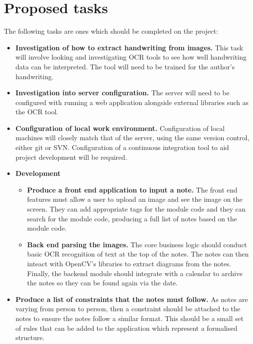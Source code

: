 \documentclass[11pt,fleqn,twoside]{article}
\begin{document}
\section{Proposed tasks}
The following tasks are ones which should be completed on the project:
\begin{itemize}

\item \textbf{Investigation of how to extract handwriting from images.} This task will involve looking and investigating OCR tools to see how well handwriting data can be interpreted. The tool will need to be trained for the author's handwriting.

\item \textbf{Investigation into server configuration.} The server will need to be configured with running a web application alongside external libraries such as the OCR tool.

\item \textbf{Configuration of local work environment.} Configuration of local machines will closely match that of the server, using the same version control, either git or SVN. Configuration  of a continuous integration tool to aid project development will be required.

\item \textbf{Development}
  \begin{itemize}

    \item \textbf{Produce a front end application to input a note.} The front end features must allow a user to upload an image and see the image on the screen. They can add appropriate tags for the module code and they can search for the module code, producing a full list of notes based on the module code.

    \item \textbf{Back end parsing the images.} The core business logic should conduct basic OCR recognition of text at the top of the notes. The notes can then inteact with OpenCV's libraries to extract diagrams from the notes. Finally, the backend module should integrate with a calendar to archive the notes so they can be found again via the date.

  \end{itemize}

\item \textbf{Produce a list of constraints that the notes must follow.} As notes are varying from person to person, then a constraint should be attached to the notes to ensure the notes follow a similar format. This should be a small set of rules that can be added to the application which represent a formalised structure.


\end{itemize}
\end{document}
